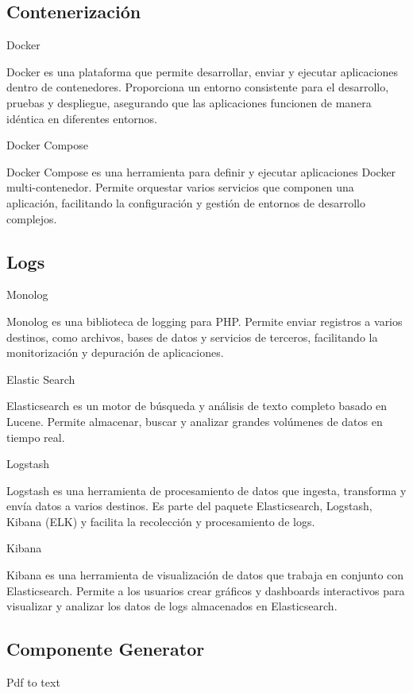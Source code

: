 \subsection{Contenerización}

Docker

Docker es una plataforma que permite desarrollar, enviar y ejecutar aplicaciones dentro de
contenedores.
Proporciona un entorno consistente para el desarrollo, pruebas y despliegue, asegurando que las aplicaciones funcionen
de manera idéntica en diferentes entornos.

Docker Compose

Docker Compose es una herramienta para definir y ejecutar aplicaciones Docker multi-contenedor.
Permite orquestar varios servicios que componen una aplicación, facilitando
la configuración y gestión de entornos de desarrollo complejos.

\subsection{Logs}

Monolog

Monolog es una biblioteca de logging para PHP. Permite enviar registros a varios destinos, como archivos, bases de datos
y servicios de terceros, facilitando la monitorización y depuración de aplicaciones.

Elastic Search

Elasticsearch es un motor de búsqueda y análisis de texto completo basado en Lucene.
Permite almacenar, buscar y analizar grandes volúmenes de datos en tiempo real.

Logstash

Logstash es una herramienta de procesamiento de datos que ingesta, transforma y envía datos a varios
destinos.
Es parte del paquete Elasticsearch, Logstash, Kibana (ELK) y facilita la recolección y procesamiento de logs.

Kibana

Kibana es una herramienta de visualización de datos que trabaja en conjunto con Elasticsearch.
Permite a los usuarios crear gráficos y dashboards interactivos para visualizar y analizar los datos de logs almacenados
en Elasticsearch.

\subsection{Componente Generator}

Pdf to text


